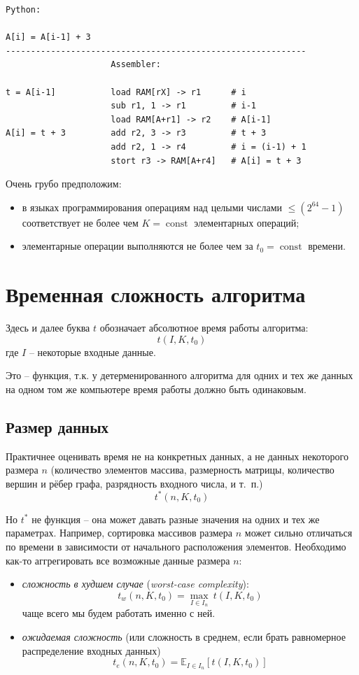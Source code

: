 \documentclass[12pt,a4paper]{report}
\def\const{\mathop{\mathrm{const}}\nolimits}
\begin{document}
\begin{verbatim}
Python:

A[i] = A[i-1] + 3
------------------------------------------------------------
                     Assembler:

t = A[i-1]           load RAM[rX] -> r1      # i
                     sub r1, 1 -> r1         # i-1
                     load RAM[A+r1] -> r2    # A[i-1]
A[i] = t + 3         add r2, 3 -> r3         # t + 3
                     add r2, 1 -> r4         # i = (i-1) + 1
                     stort r3 -> RAM[A+r4]   # A[i] = t + 3
\end{verbatim}

Очень грубо предположим:
\begin{itemize}
\item в языках программирования операциям над целыми числами $\leq (2^{64}-1)$ соответствует не более чем $K=\const$ элементарных операций;
\item элементарные операции выполняются не более чем за $t_0=\const$ времени.
\end{itemize}


\section*{Временная сложность алгоритма}

Здесь и далее буква $t$ обозначает абсолютное время работы алгоритма:
$$
t(I, K, t_0)
$$
где $I$ -- некоторые входные данные.

Это -- функция, т.к. у детерменированного алгоритма для одних и тех же данных на одном том же компьютере время работы должно быть одинаковым.

\subsection*{Размер данных}

Практичнее оценивать время не на конкретных данных, а не данных некоторого размера $n$ (количество элементов массива, размерность матрицы, количество вершин и рёбер графа, разрядность входного числа, и т.~п.)
$$
t^*(n, K, t_0)
$$

Но $t^*$ не функция -- она может давать разные значения на одних и тех же параметрах. Например, сортировка массивов размера $n$ может сильно отличаться по времени в зависимости от начального расположения элементов. Необходимо как-то аггрегировать все возможные данные размера $n$: 

\begin{itemize}
\item {\em сложность в худшем случае} ({\em worst-case complexity}):
$$
\boxed{
  t_w(n, K, t_0) = \max_{I \in I_n}~{t(I, K, t_0)}  
}
$$
чаще всего мы будем работать именно с ней.
\item {\em ожидаемая сложность} (или сложность в среднем, если брать равномерное распределение входных данных)
$$
t_e(n, K, t_0) = \mathbb{E}_{I \in I_n} \left[ {t(I, K, t_0)} \right]
$$
\end{itemize}
\end{document}
